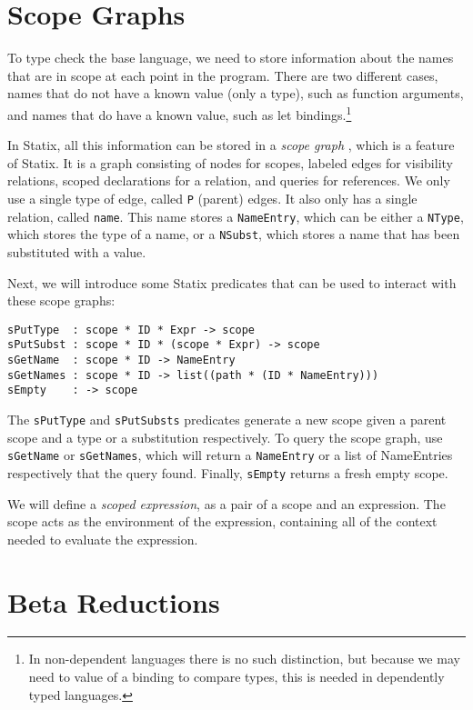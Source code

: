 \section{Scope Graphs}
\label{sec:coc-scopes}

To type check the base language, we need to store information about the names that are in scope at each point in the program. There are two different cases, names that do not have a known value (only a type), such as function arguments, and names that do have a known value, such as let bindings.\footnote{In non-dependent languages there is no such distinction, but because we may need to value of a binding to compare types, this is needed in dependently typed languages.}

In Statix, all this information can be stored in a \emph{scope graph} \cite{scope_graphs}, which is a feature of Statix. It is a graph consisting of nodes for scopes, labeled edges for visibility relations, scoped declarations for a relation, and queries for references. We only use a single type of edge, called \verb|P| (parent) edges. It also only has a single relation, called \verb|name|. This name stores a \verb|NameEntry|, which can be either a \verb|NType|, which stores the type of a name, or a \verb|NSubst|, which stores a name that has been substituted with a value.

Next, we will introduce some Statix predicates that can be used to interact with these scope graphs:

\begin{lstlisting}
sPutType  : scope * ID * Expr -> scope
sPutSubst : scope * ID * (scope * Expr) -> scope
sGetName  : scope * ID -> NameEntry
sGetNames : scope * ID -> list((path * (ID * NameEntry)))
sEmpty    : -> scope
\end{lstlisting}
The \verb|sPutType| and \verb|sPutSubsts| predicates generate a new scope given a parent scope and a type or a substitution respectively. To query the scope graph, use \verb|sGetName| or \verb|sGetNames|, which will return a \verb|NameEntry| or a list of NameEntries respectively that the query found. Finally, \verb|sEmpty| returns a fresh empty scope.

We will define a \emph{scoped expression}, as a pair of a scope and an expression. The scope acts as the environment of the expression, containing all of the context needed to evaluate the expression.


\section{Beta Reductions}
\label{sec:coc-dynsyms}

